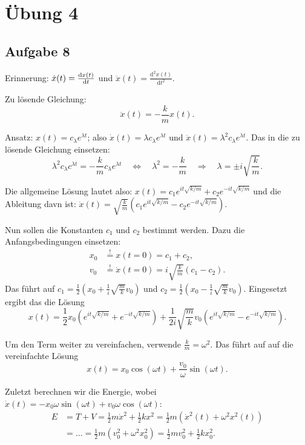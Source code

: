 \chapter{Übung 4}

\section*{Aufgabe 8}

Erinnerung: $\dot{x}(t) = \frac{\mathrm{d}x(t)}{\mathrm{d}t}$ und $\ddot{x}(t) = \frac{\mathrm{d}^2 x(t)}{\mathrm{d} t^2}$.

Zu lösende Gleichung:
\[
	\ddot{x}(t) = -\frac{k}{m} x(t)
	\text{.}
\]

Ansatz: $x(t) = c_\lambda e^{\lambda t}$; also $\dot{x}(t) = \lambda c_\lambda e^{\lambda t}$ und $\ddot{x}(t) = \lambda^2 c_\lambda e^{\lambda t}$. Das in die zu lösende Gleichung einsetzen:
\[
	\lambda^2 c_\lambda c^{\lambda t} = -\frac{k}{m} c_\lambda e^{\lambda t}
	\quad \Longleftrightarrow \quad
	\lambda^2 = -\frac{k}{m}
	\quad \Longrightarrow \quad
	\lambda = \pm i \sqrt{\frac{k}{m}}
	\text{.}
\]

Die allgemeine Lösung lautet also: $x(t) = c_1 e^{it \sqrt{k / m}} + c_2 e^{-it \sqrt{k / m}}$ und die Ableitung davn ist: $\dot{x}(t) = \sqrt{\frac{k}{m}} \left( c_1 e^{it \sqrt{k / m}} - c_2 e^{-it \sqrt{k / m}} \right)$.

Nun sollen die Konstanten $c_1$ und $c_2$ bestimmt werden. Dazu die Anfangsbedingungen einsetzen:
\begin{align*}
	x_0 &\overset{!}{=} x(t = 0) = c_1 + c_2,	 \\
	v_0 &\overset{!}{=} \dot{x}(t = 0) = i \sqrt{\frac{k}{m}} (c_1 - c_2)
	\text{.}
\end{align*}
Das führt auf $c_1 = \frac{1}{2} \left( x_0 + \frac{1}{i} \sqrt{\frac{m}{k}} v_0 \right)$ und $c_2 = \frac{1}{2} \left( x_0 - \frac{1}{i} \sqrt{\frac{m}{k}} v_0 \right)$. Eingesetzt ergibt das die Lösung
\[
	x(t) = \frac{1}{2} x_0 \left( e^{it \sqrt{k / m}} + e^{-it \sqrt{k / m}} \right)
	+ \frac{1}{2i} \sqrt{\frac{m}{k}} v_0 \left( e^{it \sqrt{k / m}} - e^{-it \sqrt{k / m}} \right)
	\text{.}
\]

Um den Term weiter zu vereinfachen, verwende $\frac{k}{m} = \omega^2$. Das führt auf auf die vereinfachte Lösung
\[
	x(t) = x_0 \cos(\omega t) + \frac{v_0}{\omega} \sin(\omega t)
	\text{.}
\]

Zuletzt berechnen wir die Energie, wobei $\dot{x}(t) = -x_0 \omega \sin(\omega t) + v_0 \omega \cos(\omega t)$:
\begin{align*}
	E &= T + V = \frac{1}{2} m \dot{x}^2 + \frac{1}{2} k x^2	 = \frac{1}{2} m \left( \dot{x}^2(t) + \omega^2 x^2(t) \right) \\
	&= \dots = \frac{1}{2} m \left( v_0^2 + \omega^2 x_0^2 \right) = \frac{1}{2} m v_0^2 + \frac{1}{2} k x_0^2
	\text{.}
\end{align*}

